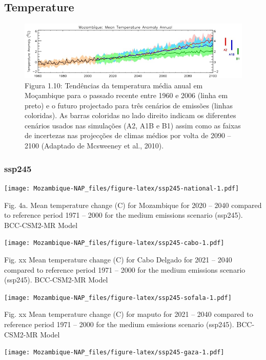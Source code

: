 \documentclass[
]{book}
\begin{document}
\hypertarget{temperature}{%
\subsection{Temperature}\label{temperature}}

\begin{figure}
\centering
\includegraphics{images/temp_anomaly.png}
\caption{Figura 1.10: Tendências da temperatura média anual em Moçambique para o passado recente entre 1960 e 2006 (linha em preto) e o futuro projectado para três cenários de emissões (linhas coloridas). As barras coloridas no lado direito indicam os diferentes cenários usados nas simulações (A2, A1B e B1) assim como as faixas de incertezas nas projecções de climas médios por volta de 2090 -- 2100 (Adaptado de Mcsweeney et al., 2010).}
\end{figure}

\hypertarget{ssp245}{%
\subsubsection{ssp245}\label{ssp245}}

\texttt{[image: Mozambique-NAP\_files/figure-latex/ssp245-national-1.pdf]}

Fig. 4a. Mean temperature change (C) for Mozambique for 2020 -- 2040 compared to reference period 1971 -- 2000 for the medium emissions scenario (ssp245). BCC-CSM2-MR Model

\texttt{[image: Mozambique-NAP\_files/figure-latex/ssp245-cabo-1.pdf]}

Fig. xx Mean temperature change (C) for Cabo Delgado for 2021 -- 2040 compared to reference period 1971 -- 2000 for the medium emissions scenario (ssp245). BCC-CSM2-MR Model

\texttt{[image: Mozambique-NAP\_files/figure-latex/ssp245-sofala-1.pdf]}

Fig. xx Mean temperature change (C) for maputo for 2021 -- 2040 compared to reference period 1971 -- 2000 for the medium emissions scenario (ssp245). BCC-CSM2-MR Model

\texttt{[image: Mozambique-NAP\_files/figure-latex/ssp245-gaza-1.pdf]}
\end{document}

